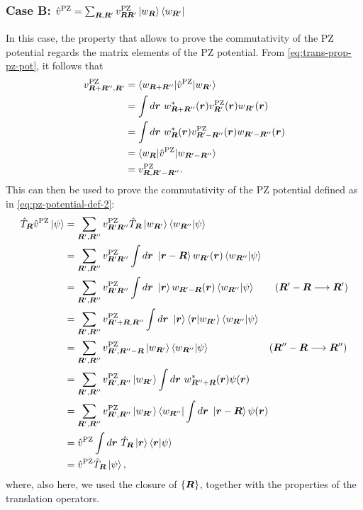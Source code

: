 \subsubsection*{Case B: $\hat{v}^{\rm PZ} = \sum_{{\bm R}, {\bm R}'} v^{\rm PZ}_{{\bm R} {\bm R}'} \ket{w_{{\bm R}}} \bra{w_{{\bm R}'}}$}
In this case, the property that allows to prove the commutativity of the PZ potential regards the matrix elements of the PZ potential. From \cref{eq:trans-prop-pz-pot}, it follows that
%
\begin{equation}
    \begin{split}
        v^{\rm PZ}_{{\bm R}+{\bm R}'',{\bm R}'} &= \braket{w_{{\bm R}+{\bm R}''} | \hat{v}^{\rm PZ} | w_{{\bm R}'}} \\
        &= \int d{\bm r}\ w^*_{{\bm R}+{\bm R}''}({\bm r}) v^{\rm PZ}_{{\bm R}'}({\bm r}) w_{{\bm R}'}({\bm r}) \\
        &= \int d{\bm r}\ w^*_{{\bm R}}({\bm r}) v^{\rm PZ}_{{\bm R}'-{\bm R}''}({\bm r}) w_{{\bm R}'-{\bm R}''}({\bm r}) \\
        &= \braket{w_{{\bm R}} | \hat{v}^{\rm PZ} | w_{{\bm R}'-{\bm R}''}} \\
        &= v^{\rm PZ}_{{\bm R},{\bm R}'-{\bm R}''} .
    \end{split}
    \label{eq:trans-prop-matrix-element}
\end{equation}
%
This can then be used to prove the commutativity of the PZ potential defined as in \cref{eq:pz-potential-def-2}:
%
\begin{equation}
    \begin{split}
        \tR \vpz \ket{\psi} &= \sum_{\bR',\bR''} v^{\rm PZ}_{\bR' \bR''} \tR \ket{\wRp} \braket{w_{\bR''}|\psi} \\
        &= \sum_{\bR',\bR''} v^{\rm PZ}_{\bR' \bR''} \int d\br \ \ket{\br - \bR} \wRp(\br) \braket{w_{\bR''}|\psi} \\
        &= \sum_{\bR',\bR''} v^{\rm PZ}_{\bR' \bR''} \int d\br \ \ket{\br} w_{\bR'- \bR}(\br) \braket{w_{\bR''}|\psi} \qquad (\bR' - \bR \longrightarrow \bR') \\
        &= \sum_{\bR',\bR''} v^{\rm PZ}_{\bR'+\bR,\bR''} \int d\br \ \ket{\br} \braket{\br|\wRp} \braket{w_{\bR''}|\psi} \\
        &= \sum_{\bR',\bR''} v^{\rm PZ}_{\bR',\bR''-\bR} \ket{\wRp} \braket{w_{\bR''}|\psi} \qquad \qquad \qquad (\bR''-\bR \longrightarrow \bR'') \\
        &= \sum_{\bR',\bR''} v^{\rm PZ}_{\bR',\bR''} \ket{\wRp} \int d\br \ w_{\bR''+\bR}^*(\br) \psi(\br) \\
        &= \sum_{\bR',\bR''} v^{\rm PZ}_{\bR',\bR''} \ket{\wRp} \bra{w_{\bR''}} \int d\br \ \ket{\br-\bR} \psi(\br) \\
        &= \vpz \int d\br \ \tR \ket{\br} \braket{\br|\psi} \\
        &= \vpz \tR \ket{\psi} ,
    \end{split}
\end{equation}
%
where, also here, we used the closure of $\{ {\bm R} \}$, together with the properties of the translation operators.

